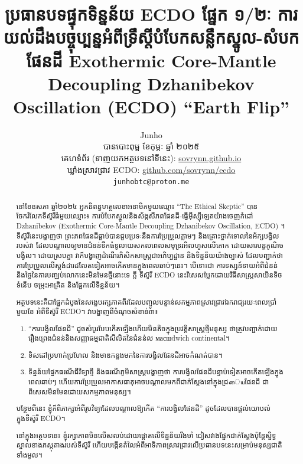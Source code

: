 \documentclass[10pt,twocolumn,letterpaper]{article}
\begin{document}
\title{ប្រធានបទផ្ទុកទិន្នន័យ ECDO ផ្នែក ១/២ៈ ការយល់ដឹងបច្ចុប្បន្នអំពីទ្រឹស្តីបំបែកសន្លឹកស្នូល-សំបកផែនដី Exothermic Core-Mantle Decoupling Dzhanibekov Oscillation (ECDO) “Earth Flip”}

\author{Junho\\
បានបោះពុម្ព ខែកុម្ភៈ ឆ្នាំ ២០២៥\\
គេហទំព័រ (ទាញយកអត្ថបទនៅទីនេះ): \href{https://sovrynn.github.io}{sovrynn.github.io}\\
ឃ្លាំងស្រាវជ្រាវ ECDO: \href{https://github.com/sovrynn/ecdo}{github.com/sovrynn/ecdo}\\
{\tt\small junhobtc@proton.me}
}

\maketitle

\begin{abstract}
នៅខែឧសភា ឆ្នាំ២០២៤ អ្នកនិពន្ធហត្ថលេខាអនាមិកមួយឈ្មោះ “The Ethical Skeptic” \cite{0} បានចែករំលែកទីស៊ូរីធំមួយឈ្មោះ៖ ការបំបែកស្នូលនិងស័ង្កសីភពផែនដី-ធ្វើអុីស្ស៊ីឡេតយ៉ាងចេញកំដៅ Dzhanibekov (Exothermic Core-Mantle Decoupling Dzhanibekov Oscillation, ECDO) \cite{1}។ ទីស៊ូរីនេះបង្ហាញថា ព្រះភពផែនដីធ្លាប់បានជួបប្រទៈនឹងការប្រែប្រួលភ្លាមៗ និងគ្រោះថ្នាក់ទោលនៃអ័ក្សបង្វិល របស់វា ដែលបណ្តាលឲ្យមានជំនន់ទឹកធំទូលាយសកលពេលសមុទ្ររអិលហួសលើគោក ដោយសារបន្តកូណិចបង្វិល។ ដោយស្របគ្នា វាក៏បង្ហាញដំណើរភិសិកសាស្ត្រជាអភិប្បដ្ឋាន និងទិន្នន័យយ៉ាងច្បាស់ ដែលបញ្ជាក់ថា ការប្រែប្រួលលើស្តង់ដារដលែតទៀតអាចកើតមានក្នុងពេលឆាប់ៗនេះ។ បើទោះជា ការទស្សន៍ទាយអំពីជំនន់ និងថ្ងៃនៃការបញ្ឈប់លោកនេះមិនមែនថ្មីនោះទេ ក្តី​ ទីស៊ូរី ECDO នេះវិសេសប្លែកដោយវិធីសាស្ត្រសាយិនទិច ទំនើប ចម្រុះអាគ្រិត និងផ្អែកលើទិន្នន័យ។

អត្ថបទនេះគឺជាផ្នែកដំបូងនៃសង្ខេបរក្សភាគពីរដែលបញ្ចូលបន្ទាន់សកម្មភាពស្រាវជ្រាវឯករាជ្យរយៈពេលប្រាំមួយខែ \cite{2,20} អំពីទីស៊ូរី ECDO។ វាបង្ហាញពីចំណុចសំខាន់៣៖

\begin{flushleft}
\begin{enumerate}
    \item “ការបង្វិលផែនដី” ដូចសំបូរបែបកើតឡើងហើយមិនតិចក្នុងប្រវត្តិសាស្ត្រថ្មីមនុស្ស ថាត្រូវបញ្ជាក់ដោយរឿងព្រេងជំនន់និងសញ្ញាធម្មជាតិសីលិតនៃជំនន់ល масшdwich continental។
    \item ទិសដៅប្រហាក់ប្រហែល និងមាឌកន្លងមកនៃការបង្វិលផែនដីអាចកំណត់បាន។
    \item ទិន្នន័យផ្នែកធរណីជីវិទ្យាថ្មី និងធរណីភូមិសាស្ត្របង្ហាញថា ការបង្វិលផែនដីបន្ទាប់ទៀតអាចកើតឡើងក្នុងពេលឆាប់ៗ ហើយការប្រែប្រួលអាកាសធាតុអាចបណ្តាលមកពីជាក់ស្តែងនៅក្នុងជ្រையផែនដី ជាពិសេសមិនមែនដោយសកម្មភាពមនុស្ស។
\end{enumerate}
\end{flushleft}

បន្ថែមពីនេះ ខ្ញុំក៏ពិភាក្សាអំពីរូបវិទ្យាដែលបណ្តាលឱ្យកើត “ការបង្វិលផែនដី” ដូចដែលបានផ្ដល់យោបល់ក្នុងទីស៊ូរី ECDO។

នៅក្នុងអត្ថបទនេះ ខ្ញុំរក្សាភាពមិនលើសលប់ដោយផ្ដោតលើទិន្នន័យរឹងមាំ ជៀសវាងផ្នែកជាក់ស្តែងប៉ុន្តែស្និទ្ធស្នាលខាងភស្តុតាងរបស់ទីស៊ូរី ហើយបង្កើនតំលៃអំពីអាទិភាពស្រាវជ្រាវលើប្រធានបទនេះសម្រាប់មនុស្សជាតិទាំងមូល។
\end{abstract}
\end{document}

